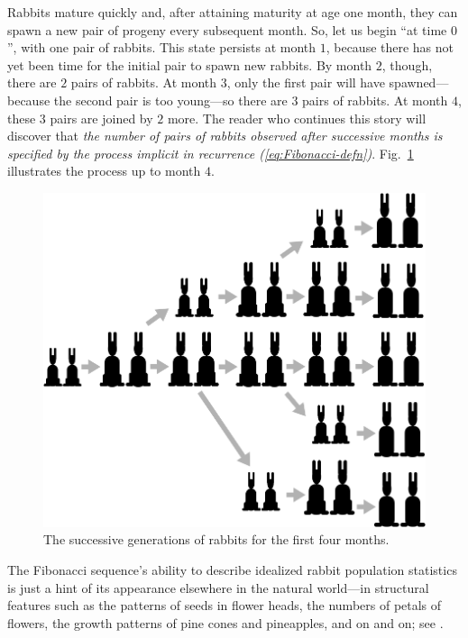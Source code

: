 Rabbits mature quickly and, after attaining maturity at age one month, they can spawn a new pair of progeny every subsequent month.  So, let us begin ``at time $0$'', with one pair of rabbits.  This state persists at month $1$, because there has not yet been time for the initial pair to spawn new rabbits.  By month $2$, though, there are $2$ pairs of rabbits.  At month $3$, only the first pair will have spawned---because the second pair is too young---so there are $3$ pairs of rabbits.  At month $4$, these $3$ pairs are joined by $2$ more.  The reader who continues this story will discover that {\em the number of pairs of rabbits observed after successive months is specified by the process implicit in recurrence (\ref{eq:Fibonacci-defn})}.  Fig.~\ref{fig:fibo5} illustrates the process up to month $4$.
\begin{figure}[htb]
\begin{center}
        \includegraphics[scale=0.275]{FiguresMaths//Fibo5}
\caption{The successive generations of rabbits for the first four months.}
        \label{fig:fibo5}
\end{center}
\end{figure}

\smallskip

The Fibonacci sequence's ability to describe idealized rabbit population statistics is just a hint of its appearance elsewhere in the natural world---in structural features such as the patterns of seeds in flower heads, the numbers of petals of flowers, the growth patterns of pine cones and pineapples, and on and on; see \cite{Basin63}.

